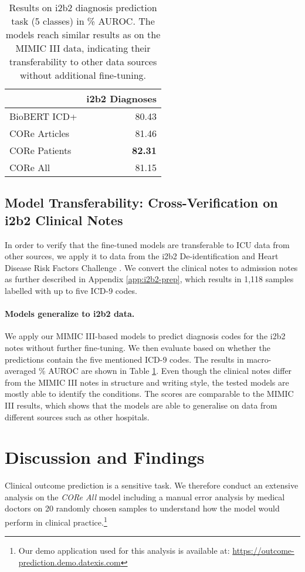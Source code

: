 \documentclass[11pt,a4paper]{article}
\begin{document}
\begin{table}[b!]
        \begin{tabularx}{\columnwidth}{Xr}
            \hline
             & i2b2 Diagnoses\\ \hline
            BioBERT ICD+ & 80.43  \\
            CORe Articles & 81.46 \\ 
            CORe Patients  & \textbf{82.31} \\
            CORe All  & 81.15 \\ \hline
        \end{tabularx}
    \caption{Results on i2b2 diagnosis prediction task (5 classes) in \% AUROC. The models reach similar results as on the MIMIC III data, indicating their transferability to other data sources without additional fine-tuning.}
    \label{table:i2b2_results}
\end{table}

\subsection{Model Transferability: Cross-Verification on i2b2 Clinical Notes}
In order to verify that the fine-tuned models are transferable to ICU data from other sources, we apply it to data from the i2b2 De-identification and Heart Disease Risk Factors Challenge \cite{i2b2-2014}. We convert the clinical notes to admission notes as further described in Appendix \ref{app:i2b2-prep}, which results in 1,118 samples labelled with up to five ICD-9 codes.

\paragraph{Models generalize to i2b2 data.} 
\label{sec:i2b2}
We apply our MIMIC III-based models to predict diagnosis codes for the i2b2 notes without further fine-tuning. We then evaluate based on whether the predictions contain the five mentioned ICD-9 codes. The results in macro-averaged \% AUROC are shown in Table \ref{table:i2b2_results}. Even though the clinical notes differ from the MIMIC III notes in structure and writing style, the tested models are mostly able to identify the conditions. The scores are comparable to the MIMIC III results, which shows that the models are able to generalise on data from different sources such as other hospitals. \section{Discussion and Findings}
\label{section:discussion}
Clinical outcome prediction is a sensitive task. We therefore conduct an extensive analysis on the \textit{CORe All} model including a manual error analysis by medical doctors on 20 randomly chosen samples to understand how the model would perform in clinical practice.\footnote{Our demo application used for this analysis is available at: \url{https://outcome-prediction.demo.datexis.com}}
\end{document}
